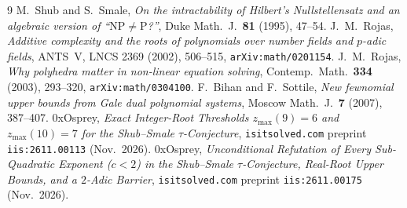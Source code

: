 \documentclass[11pt]{article}
\newcommand{\code}[1]{\texttt{#1}}
\begin{document}
\begin{thebibliography}{9}
 M.~Shub and S.~Smale, \emph{On the intractability of Hilbert's Nullstellensatz and an algebraic version of ``$\mathrm{NP} \neq \mathrm{P}$?''}, Duke Math.\ J.\ \textbf{81} (1995), 47--54.
 J.~M.~Rojas, \emph{Additive complexity and the roots of polynomials over number fields and $p$-adic fields}, ANTS~V, LNCS 2369 (2002), 506--515, \code{arXiv:math/0201154}.
 J.~M.~Rojas, \emph{Why polyhedra matter in non-linear equation solving}, Contemp.\ Math.\ \textbf{334} (2003), 293--320, \code{arXiv:math/0304100}.
 F.~Bihan and F.~Sottile, \emph{New fewnomial upper bounds from Gale dual polynomial systems}, Moscow Math.\ J.\ \textbf{7} (2007), 387--407.
 0xOsprey, \emph{Exact Integer-Root Thresholds $z_{\max}(9) = 6$ and $z_{\max}(10) = 7$ for the Shub--Smale $\tau$-Conjecture}, \code{isitsolved.com} preprint \code{iis:2611.00113} (Nov.~2026).
 0xOsprey, \emph{Unconditional Refutation of Every Sub-Quadratic Exponent ($c < 2$) in the Shub--Smale $\tau$-Conjecture, Real-Root Upper Bounds, and a $2$-Adic Barrier}, \code{isitsolved.com} preprint \code{iis:2611.00175} (Nov.~2026).
\end{thebibliography}
\end{document}

